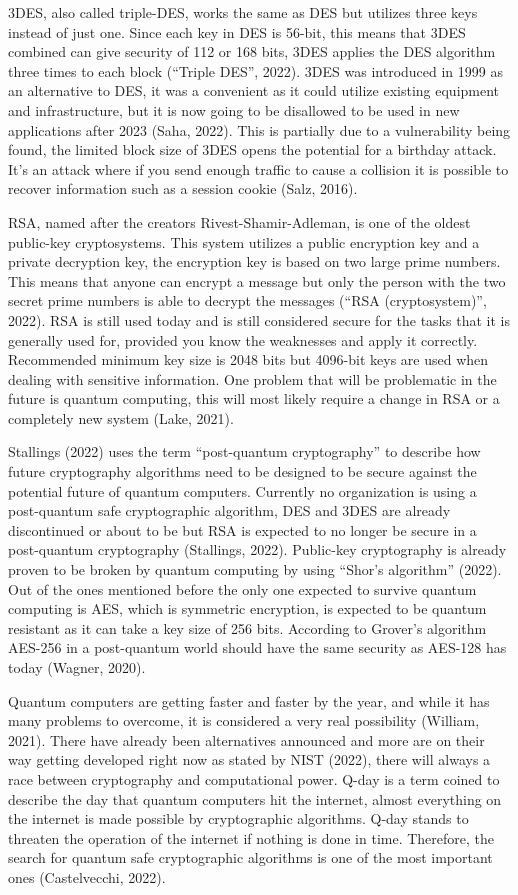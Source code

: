 \documentclass[11pt]{article}
\begin{document}
3DES, also called triple-DES, works the same as DES but utilizes three
keys instead of just one. Since each key in DES is 56-bit, this means
that 3DES combined can give security of 112 or 168 bits, 3DES applies
the DES algorithm three times to each block (``Triple DES'', 2022). 3DES
was introduced in 1999 as an alternative to DES, it was a convenient as
it could utilize existing equipment and infrastructure, but it is now
going to be disallowed to be used in new applications after 2023 (Saha,
2022). This is partially due to a vulnerability being found, the limited
block size of 3DES opens the potential for a birthday attack. It's an
attack where if you send enough traffic to cause a collision it is
possible to recover information such as a session cookie (Salz, 2016).

RSA, named after the creators Rivest-Shamir-Adleman, is one of the
oldest public-key cryptosystems. This system utilizes a public
encryption key and a private decryption key, the encryption key is based
on two large prime numbers. This means that anyone can encrypt a message
but only the person with the two secret prime numbers is able to decrypt
the messages (``RSA (cryptosystem)'', 2022). RSA is still used today and
is still considered secure for the tasks that it is generally used for,
provided you know the weaknesses and apply it correctly. Recommended
minimum key size is 2048 bits but 4096-bit keys are used when dealing
with sensitive information. One problem that will be problematic in the
future is quantum computing, this will most likely require a change in
RSA or a completely new system (Lake, 2021).

Stallings (2022) uses the term ``post-quantum cryptography'' to describe
how future cryptography algorithms need to be designed to be secure
against the potential future of quantum computers. Currently no
organization is using a post-quantum safe cryptographic algorithm, DES
and 3DES are already discontinued or about to be but RSA is expected to
no longer be secure in a post-quantum cryptography (Stallings, 2022).
Public-key cryptography is already proven to be broken by quantum
computing by using ``Shor's algorithm'' (2022). Out of the ones
mentioned before the only one expected to survive quantum computing is
AES, which is symmetric encryption, is expected to be quantum resistant
as it can take a key size of 256 bits. According to Grover's algorithm
AES-256 in a post-quantum world should have the same security as AES-128
has today (Wagner, 2020).

Quantum computers are getting faster and faster by the year, and while
it has many problems to overcome, it is considered a very real
possibility (William, 2021). There have already been alternatives
announced and more are on their way getting developed right now as
stated by NIST (2022), there will always a race between cryptography and
computational power. Q-day is a term coined to describe the day that
quantum computers hit the internet, almost everything on the internet is
made possible by cryptographic algorithms. Q-day stands to threaten the
operation of the internet if nothing is done in time. Therefore, the
search for quantum safe cryptographic algorithms is one of the most
important ones (Castelvecchi, 2022).  
\end{document}

